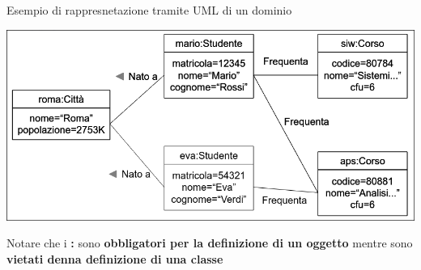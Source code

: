 \documentclass{article}
\begin{document}
Esempio di rappresnetazione tramite UML di un dominio
\begin{center}
    \includegraphics[width=\textwidth]{images/esempio dominio di informazione.png}
\end{center}
Notare che i \textbf{:} sono \textbf{obbligatori per la definizione di un oggetto} mentre sono \textbf{vietati denna definizione di una classe}
\end{document}
